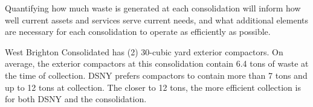 
    Quantifying how much waste is generated at each consolidation will inform how well current assets and services serve current needs, and what additional elements are necessary for each consolidation to operate as efficiently as possible.
    
    West Brighton Consolidated has (2) 30-cubic yard exterior compactors. On average, the exterior compactors at this consolidation contain 6.4 tons of waste at the time of collection. DSNY prefers compactors to contain more than 7 tons and up to 12 tons at collection. The closer to 12 tons, the more efficient collection is for both DSNY and the consolidation.